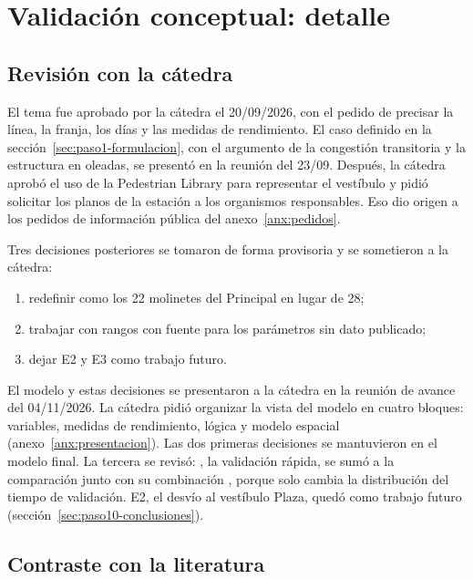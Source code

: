 \section{Validación conceptual: detalle}
\label{anx:validacion-conceptual}

\subsection{Revisión con la cátedra}
\label{anx:catedra}

El tema fue aprobado por la cátedra el 20/09/2026, con el pedido de precisar la línea, la franja, los días
y las medidas de rendimiento. El caso definido en la sección~\ref{sec:paso1-formulacion}, con el argumento
de la congestión transitoria y la estructura en oleadas, se presentó en la reunión del 23/09. Después, la
cátedra aprobó el uso de la Pedestrian Library para representar el vestíbulo y pidió solicitar los planos de la
estación a los organismos responsables. Eso dio origen a los pedidos de información pública del
anexo~\ref{anx:pedidos}.

Tres decisiones posteriores se tomaron de forma provisoria y se sometieron a la cátedra:
\begin{enumerate}
  \item redefinir \EI{} como los 22 molinetes del Principal en lugar de 28;
  \item trabajar con rangos con fuente para los parámetros sin dato publicado;
  \item dejar E2 y E3 como trabajo futuro.
\end{enumerate}
El modelo y estas decisiones se presentaron a la cátedra en la reunión de avance del 04/11/2026. La cátedra
pidió organizar la vista del modelo en cuatro bloques: variables, medidas de rendimiento, lógica y modelo
espacial (anexo~\ref{anx:presentacion}). Las dos primeras decisiones se mantuvieron en el
modelo final. La tercera se revisó: \ET{}, la validación rápida, se sumó a la comparación junto con su
combinación \EIT{}, porque solo cambia la distribución del tiempo de validación. E2, el desvío al vestíbulo
Plaza, quedó como trabajo futuro (sección~\ref{sec:paso10-conclusiones}).

\subsection{Contraste con la literatura}

